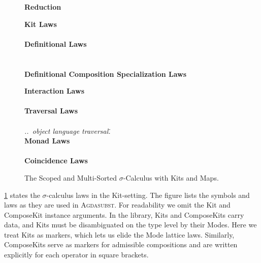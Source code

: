 \documentclass[screen,nonacm]{acmart}
\begin{document}
\begin{figure}[tp]
      {\raggedright{} \vspace{2.0em} \textbf{\Large Reduction} \par}
      \vspace{1.5em}
      \begin{minipage}[t]{0.40\textwidth}
            \small{}
            \raggedright{}
            \textbf{Kit Laws}\\
            \ETypeLevel{}\\
            \vspace{0.5em}
            \textbf{Definitional Laws}\\
            \vspace{0.5em}
            \EDefLawTy{}\\
            \vspace{0.5em}
            \EDefLaw{}\\
            \vspace{0.5em}
            \textbf{Definitional Composition Specialization Laws}
            \ESpecialDefLaws{}
      \end{minipage}
      \hfill
      \begin{minipage}[t]{0.54\textwidth}
            \small{}
            \raggedright{}
            \textbf{Interaction Laws}\\
            \EInteraction{}\\
            \vspace{0.5em}
            \textbf{Traversal Laws}\\
            \ETravL{}\\
            \emph{..\ object language traversal\..}\\
            \vspace{0.5em}
            \textbf{Monad Laws}\\
            \EMonad{}\\
            \vspace{0.5em}
            \textbf{Coincidence Laws}\\
            \ECoincidence{}
      \end{minipage}
      \caption{The Scoped and Multi-Sorted $σ$-Calculus with Kits and Maps.}\label{fig:ags-fin}
\end{figure}

\cref{fig:ags-fin} states the $σ$-calculus laws in the Kit-setting.
The figure lists the symbols and laws as they are used in \textsc{Agdasubst}.
For readability we omit the Kit and ComposeKit instance arguments. In the
library, Kits and ComposeKits carry data, and Kits must be disambiguated on the
type level by their Modes. Here we treat Kits as markers, which lets us elide
the Mode lattice laws. Similarly, ComposeKits serve as markers for admissible
compositions and are written explicitly for each operator in square brackets.
\end{document}
